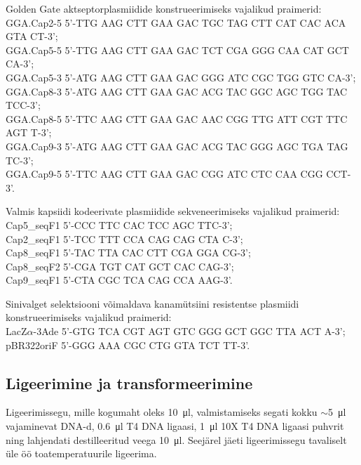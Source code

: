 \documentclass{trkut}%
\begin{document}
Golden Gate aktseptorplasmiidide konstrueerimiseks vajalikud praimerid:\\
GGA.Cap2-5 5'-TTG AAG CTT GAA GAC TGC TAG CTT CAT CAC ACA GTA CT-3';\\
GGA.Cap5-5 5'-TTG AAG CTT GAA GAC TCT CGA GGG CAA CAT GCT CA-3';\\
GGA.Cap5-3 5'-ATG AAG CTT GAA GAC GGG ATC CGC TGG GTC CA-3';\\
GGA.Cap8-3 5'-ATG AAG CTT GAA GAC ACG TAC GGC AGC TGG TAC TCC-3';\\
GGA.Cap8-5 5'-TTC AAG CTT GAA GAC AAC CGG TTG ATT CGT TTC AGT T-3';\\
GGA.Cap9-3 5'-ATG AAG CTT GAA GAC ACG TAC GGG AGC TGA TAG TC-3';\\
GGA.Cap9-5 5'-TTC AAG CTT GAA GAC CGG ATC CTC CAA CGG CCT-3'.

Valmis kapsiidi kodeerivate plasmiidide sekveneerimiseks vajalikud praimerid:\\
Cap5\_seqF1 5'-CCC TTC CAC TCC AGC TTC-3';\\
Cap2\_seqF1 5'-TCC TTT CCA CAG CAG CTA C-3';\\
Cap8\_seqF1 5'-TAC TTA CAC CTT CGA GGA CG-3';\\
Cap8\_seqF2 5'-CGA TGT CAT GCT CAC CAG-3';\\
Cap9\_seqF1 5'-CTA CGC TCA CAG CCA AAG-3'.

Sinivalget selektsiooni võimaldava kanamütsiini resistentse plasmiidi konstrueerimiseks vajalikud praimerid:\\
LacZ$\alpha$-3Ade 5'-GTG TCA CGT AGT GTC GGG GCT GGC TTA ACT A-3';\\
pBR322oriF 5'-GGG AAA CGC CTG GTA TCT TT-3'.

\subsection{Ligeerimine ja transformeerimine}

Ligeerimissegu, mille kogumaht oleks \SI{10}{\micro\litre}, valmistamiseks segati kokku $\sim$\SI{5}{\micro\litre} vajaminevat DNA-d, \SI{0,6}{\micro\litre} T4 DNA ligaasi, \SI{1}{\micro\litre} 10X T4 DNA ligaasi puhvrit ning lahjendati destilleeritud veega \SI{10}{\micro\litre}. Seejärel jäeti ligeerimissegu tavaliselt üle öö toatemperatuurile ligeerima. 
\end{document}
